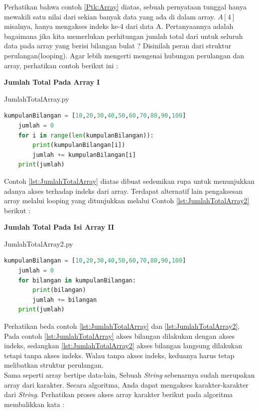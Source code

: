 \begin{enumerate}
Perhatikan bahwa contoh \ref{Ptk:Array} diatas, sebuah pernyataan tunggal hanya mewakili satu nilai dari sekian banyak data yang ada di dalam array. $A[4]$ misalnya, hanya mengakses indeks ke-4 dari data A. Pertanyaannya adalah bagaimana jika kita memerlukan perhitungan jumlah total dari untuk seluruh data pada array yang berisi bilangan bulat ? Disinilah peran dari struktur perulangan(looping). Agar lebih mengerti mengenai hubungan perulangan dan array, perhatikan contoh berikut ini : 
\pagebreak
 \begin{contoh}
	\textbf{ Jumlah Total Pada Array I}
\begin{listprog}{JumlahTotalArray.py}
\label{lst:JumlahTotalArray}
\begin{lstlisting}[language=Python]
	kumpulanBilangan = [10,20,30,40,50,60,70,80,90,100]
	jumlah = 0
	for i in range(len(kumpulanBilangan)):
		print(kumpulanBilangan[i])
		jumlah += kumpulanBilangan[i]
	print(jumlah)	
\end{lstlisting}
\end{listprog}
\end{contoh}

Contoh \ref{lst:JumlahTotalArray} diatas dibuat sedemikan rupa untuk menunjukkan adanya akses terhadap indeks dari array. Terdapat alternatif lain pengaksesan array melalui looping yang ditunjukkan melalui Contoh \ref{lst:JumlahTotalArray2} berikut : 

 \begin{contoh}
	\textbf{Jumlah Total Pada Isi Array II}
\begin{listprog}{JumlahTotalArray2.py}
\label{lst:JumlahTotalArray2}
\begin{lstlisting}[language=Python]
	kumpulanBilangan = [10,20,30,40,50,60,70,80,90,100]
	jumlah = 0
	for bilangan in kumpulanBilangan:
		print(bilangan)
		jumlah += bilangan
	print(jumlah)	
\end{lstlisting}
\end{listprog}
\end{contoh}

Perhatikan beda contoh \ref{lst:JumlahTotalArray} dan \ref{lst:JumlahTotalArray2}, Pada contoh \ref{lst:JumlahTotalArray} akses bilangan dilakukan dengan akses indeks, sedangkan \ref{lst:JumlahTotalArray2} akses bilangan langsung dilakukan tetapi tanpa akses indeks. Walau tanpa akses indeks, keduanya harus tetap melibatkan struktur perulangan.\\
Sama seperti array bertipe data-lain, Sebuah \textit{String} sebenarnya sudah merupakan array dari karakter. Secara algoritma, Anda dapat mengakses karakter-karakter dari \textit{String}. Perhatikan proses akses array karakter berikut pada algoritma membalikkan kata : 


\end{enumerate}
